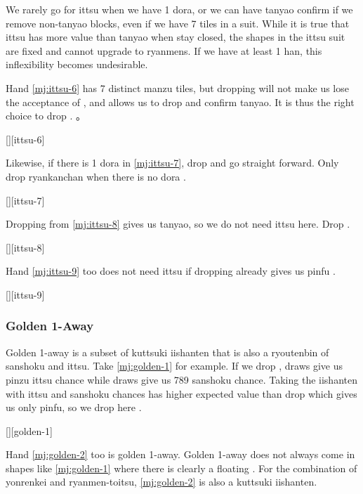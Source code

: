 \documentclass[12pt]{article}
\begin{document}
We rarely go for ittsu when we have 1 dora, or we can have tanyao confirm if we remove non-tanyao blocks, even if we have 7 tiles in a suit. While it is true that ittsu has more value than tanyao when stay closed, the shapes in the ittsu suit are fixed and cannot upgrade to ryanmens. If we have at least 1 han, this inflexibility becomes undesirable.

Hand \ref{mj:ittsu-6} has 7 distinct manzu tiles, but dropping  will not make us lose the acceptance of  , and  allows us to drop  and confirm tanyao. It is thus the right choice to drop . \citep[][p.~69]{zero-teyaku}。

[][ittsu-6]

Likewise, if there is 1 dora in \ref{mj:ittsu-7}, drop  and go straight forward. Only drop  ryankanchan when there is no dora \citep[][p.~70]{zero-teyaku}.

[][ittsu-7]

Dropping  from \ref{mj:ittsu-8} gives us tanyao, so we do not need ittsu here. Drop  \citep[][p.~70]{zero-teyaku}.

[][ittsu-8]

Hand \ref{mj:ittsu-9} too does not need ittsu if dropping  already gives us pinfu \citep{gendai-ittsu}.

[][ittsu-9]


\subsubsection*{Golden 1-Away}

Golden 1-away is a subset of kuttsuki iishanten that is also a ryoutenbin of sanshoku and ittsu. Take \ref{mj:golden-1} for example. If we drop ,  draws give us pinzu ittsu chance while  draws give us 789 sanshoku chance. Taking the iishanten with ittsu and sanshoku chances has higher expected value than  drop which gives us only pinfu, so we drop  here \citep{rb1}.

[][golden-1]

Hand \ref{mj:golden-2} too is golden 1-away. Golden 1-away does not always come in shapes like \ref{mj:golden-1} where there is clearly a floating . For the combination of yonrenkei and ryanmen-toitsu, \ref{mj:golden-2} is also a kuttsuki iishanten.
\end{document}
